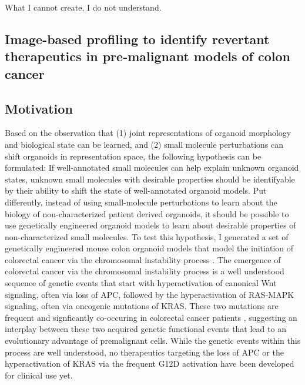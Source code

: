 \begin{savequote}[75mm]
What I cannot create, I do not understand.
\end{savequote}

\begin{flushleft}
\chapter{Image-based profiling to identify revertant therapeutics in pre-malignant models of colon cancer}

\section{Motivation}

Based on the observation that (1) joint representations of organoid morphology and biological state can be learned, and (2) small molecule perturbations can shift organoids in representation space, the following hypothesis can be formulated: If well-annotated small molecules can help explain unknown organoid states, unknown small molecules with desirable properties should be identifyable by their ability to shift the state of well-annotated organoid models. 
Put differently, instead of using small-molecule perturbations to learn about the biology of non-characterized patient derived organoids, it should be possible to use genetically engineered organoid models to learn about desirable properties of non-characterized small molecules.
\smallbreak
To test this hypothesis, I generated a set of genetically engineered mouse colon organoid models that model the initiation of colorectal cancer via the chromosomal instability process \cite{Fearon1989-wf}. The emergence of colorectal cancer via the chromosomal instability process is a well understood sequence of genetic events that start with hyperactivation of canonical Wnt signaling, often via loss of APC, followed by the hyperactivation of RAS-MAPK signaling, often via oncogenic mutations of KRAS. These two mutations are frequent and signficantly co-occuring in colorectal cancer patients \cite{Schell2016-ew}, suggesting an interplay between these two acquired genetic functional events that lead to an evolutionary advantage of premalignant cells. While the genetic events within this process are well understood, no therapeutics targeting the loss of APC or the hyperactivation of KRAS via the frequent G12D activation have been developed for clinical use yet. 


\end{flushleft}
